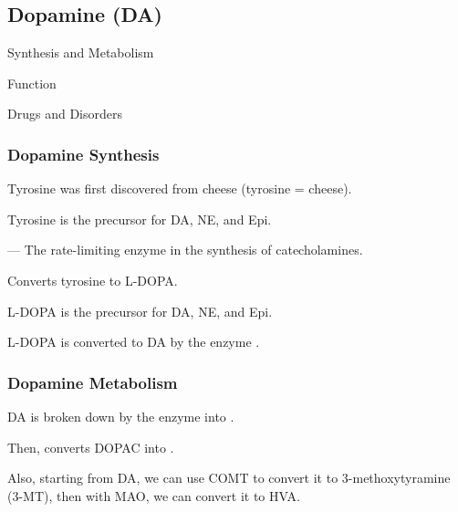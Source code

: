 \subsection{Dopamine (DA)}

\begin{coloredlist}
    \item Synthesis and Metabolism
    \item Function
    \item Drugs and Disorders
\end{coloredlist}

\subsubsection{Dopamine Synthesis}

\begin{coloredlist}
    \item Tyrosine was first discovered from cheese (tyrosine = cheese).
    \begin{coloredlist}
        \item Tyrosine is the precursor for DA, NE, and Epi.
        \item {} — The rate-limiting enzyme in the synthesis of catecholamines.
        \begin{coloredlist}
            \item Converts tyrosine to L-DOPA.
            \item L-DOPA is the precursor for DA, NE, and Epi.
        \end{coloredlist}
        \item L-DOPA is converted to DA by the enzyme .
    \end{coloredlist}
\end{coloredlist}

\subsubsection{Dopamine Metabolism}

\begin{coloredlist}
    \item DA is broken down by the enzyme  into .
    \item Then,  converts DOPAC into .
    \item Also, starting from DA, we can use COMT to convert it to 3-methoxytyramine (3-MT), then with MAO, we can convert it to HVA.
\end{coloredlist}

